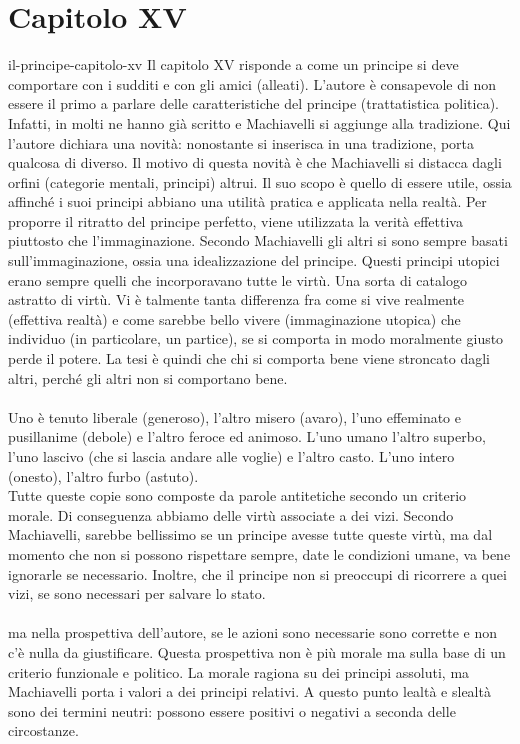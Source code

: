 \documentclass[preview]{standalone}
\begin{document}
\genpage

\section{Capitolo XV}

\begin{snippet}{il-principe-capitolo-xv}
    Il capitolo XV risponde a come un principe si deve comportare
    con i sudditi e con gli amici (alleati).
    L'autore è consapevole di non essere il primo a parlare
    delle caratteristiche del principe (trattatistica politica).
    Infatti, in molti ne hanno già scritto e Machiavelli si
    aggiunge alla tradizione.
    Qui l'autore dichiara una novità: nonostante si inserisca in una tradizione,
    porta qualcosa di diverso.
    Il motivo di questa novità è che Machiavelli si distacca
    dagli orfini (categorie mentali, principi) altrui.
    Il suo scopo è quello di essere utile, ossia
    affinché i suoi principi abbiano una utilità pratica e applicata
    nella realtà.
    Per proporre il ritratto del principe perfetto, viene utilizzata
    la verità effettiva piuttosto che l'immaginazione.
    Secondo Machiavelli gli altri si sono sempre basati sull'immaginazione,
    ossia una idealizzazione del principe.
    Questi principi utopici erano sempre quelli che incorporavano tutte le virtù.
    Una sorta di catalogo astratto di virtù.
    Vi è talmente tanta differenza fra come si vive realmente (effettiva realtà)
    e come sarebbe bello vivere (immaginazione utopica) che
    individuo (in particolare, un partice), se si comporta in modo moralmente giusto
    perde il potere. La tesi è quindi che chi si comporta bene
    viene stroncato dagli altri, perché gli altri non si comportano bene.
    \\\\
    Uno è tenuto liberale (generoso), l'altro misero (avaro),
    l'uno effeminato e pusillanime (debole) e l'altro
    feroce ed animoso. L'uno umano l'altro superbo, l'uno lascivo (che si lascia andare alle voglie) e l'altro casto.
    L'uno intero (onesto), l'altro furbo (astuto).
    \\
    Tutte queste copie sono composte da parole antitetiche
    secondo un criterio morale. Di conseguenza abbiamo delle virtù associate a dei vizi.
    Secondo Machiavelli, sarebbe bellissimo se un principe avesse tutte queste virtù,
    ma dal momento che non si possono rispettare sempre, date le condizioni umane,
    va bene ignorarle se necessario.
    Inoltre, che il principe non si preoccupi di ricorrere a quei vizi,
    se sono necessari per salvare lo stato.
    \\\\
    ma nella prospettiva dell'autore, se le azioni sono necessarie
    sono corrette e non c'è nulla da giustificare.
    Questa prospettiva non è più morale ma sulla base di un criterio funzionale
    e politico.
    La morale ragiona su dei principi assoluti, ma Machiavelli porta i valori a
    dei principi relativi.
    A questo punto lealtà e slealtà sono dei termini neutri:
    possono essere positivi o negativi a seconda delle circostanze.
\end{snippet}
\end{document}

